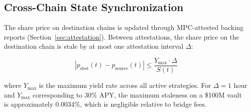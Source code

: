 \subsection{Cross-Chain State Synchronization}

The share price on destination chains is updated through MPC-attested backing reports (Section~\ref{sec:attestation}). Between attestations, the share price on the destination chain is stale by at most one attestation interval $\Delta$:

\begin{equation}
  |p_{\text{dest}}(t) - p_{\text{source}}(t)| \leq \frac{Y_{\max} \cdot \Delta}{S(t)}
\end{equation}

where $Y_{\max}$ is the maximum yield rate across all active strategies. For $\Delta = 1$ hour and $Y_{\max}$ corresponding to 30\% APY, the maximum staleness on a \$100M vault is approximately 0.0034\%, which is negligible relative to bridge fees.

